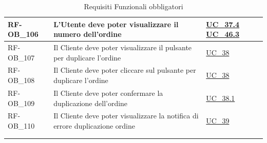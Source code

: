 \begin{longtable}{|>{\raggedright}p{}|>{\raggedright\arraybackslash}p{}|>{\raggedright\arraybackslash}p{}|}
	\hline
	RF-OB\_106 \hypertarget{rf-ob_106} & L'Utente deve poter visualizzare il numero dell'ordine & \hyperref[uc_37.4]{UC\_37.4} \newline \hyperref[uc_46.3]{UC\_46.3} \\
	\hline
	RF-OB\_107 \hypertarget{rf-ob_107} & Il Cliente deve poter visualizzare il pulsante per duplicare l'ordine & \hyperref[uc_38]{UC\_38} \\
	\hline
	RF-OB\_108 \hypertarget{rf-ob_108} & Il Cliente deve poter cliccare sul pulsante per duplicare l'ordine & \hyperref[uc_38]{UC\_38} \\
	\hline
	RF-OB\_109 \hypertarget{rf-ob_109} & Il Cliente deve poter confermare la duplicazione dell'ordine & \hyperref[uc_38.1]{UC\_38.1} \\
	\hline
	RF-OB\_110 \hypertarget{rf-ob_110} & Il Cliente deve poter visualizzare la notifica di errore duplicazione ordine & \hyperref[uc_39]{UC\_39} \\
	\hline
	\multicolumn{3}{c}{} \\
	\caption{Requisiti Funzionali obbligatori}\hypertarget{tab:funzionali_obbligatori}\\
\end{longtable}

	
